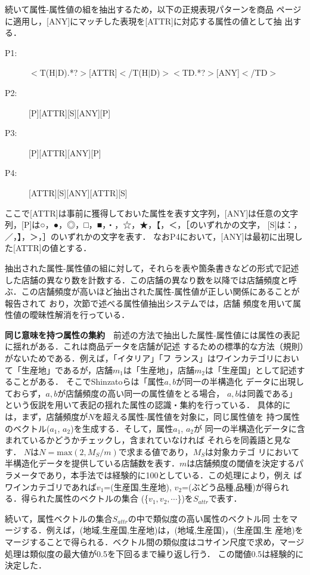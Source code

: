 \documentclass[japanese]{jnlp_1.4}
\begin{document}
続いて属性-属性値の組を抽出するため，以下の正規表現パターンを商品
ページに適用し，[ANY]にマッチした表現を[ATTR]に対応する属性の値として抽
出する．

\newpage
\begin{description}
\item [P1:] $<$T(H$|$D).*?$>$[ATTR]$<$/T(H$|$D)$><$TD.*?$>$[ANY]$<$/TD$>$
\item [P2:] [P][ATTR][S][ANY][P]
\item [P3:] [P][ATTR][ANY][P]
\item [P4:] [ATTR][S][ANY][ATTR][S]
\end{description}

\noindent
ここで[ATTR]は事前に獲得しておいた属性を表す文字列，[ANY]は任意の文字列，[P]は○，●，◎，□，■，・，☆，★，【，＜，［のいずれかの文字，
[S]は：，／，】，＞，］のいずれかの文字を表す．
なおP4において，[ANY]は最初に出現した[ATTR]の値とする．

抽出された属性-属性値の組に対して，それらを表や箇条書きなどの形式で記述
した店舗の異なり数を計数する．この店舗の異なり数を以降では店舗頻度と呼
ぶ．この店舗頻度が高いほど抽出された属性-属性値が正しい関係にあることが報告されて
おり\cite{shinzato2013}，次節で述べる属性値抽出システムでは，店舗
頻度を用いて属性値の曖昧性解消を行っている．

\vspace{1\Cvs}
\noindent
\textbf{同じ意味を持つ属性の集約}　前述の方法で抽出した属性-属性値には属性の表記に揺れがある．これは商品データを店舗が記述
するための標準的な方法（規則）がないためである．例えば，「イタリア」「フ
ランス」はワインカテゴリにおいて「生産地」であるが，店舗$m_1$は「生産地」，店舗$m_2$は「生産国」として記述することがある．
そこでShinzatoらは「属性$a, b$が同一の半構造化
データに出現しておらず，$a, b$が店舗頻度の高い同一の属性値をとる場合，
$a, b$は同義である」という仮説を用いて表記の揺れた属性の認識・集約を行っている．
具体的には，まず，店舗頻度が$N$を超える属性-属性値を対象に，同じ属性値を
持つ属性のベクトル($a_1$, $a_2$)を生成する．そして，属性$a_1$, $a_2$が
同一の半構造化データに含まれているかどうかチェックし，含まれていなければ
それらを同義語と見なす．
$N$は$N = \mathrm{max}(2, M_S/m)$で求まる値であり，$M_S$は対象カテゴ
リにおいて半構造化データを提供している店舗数を表す．$m$は店舗頻度の閾値を決定するパラメータであり，本手法では経験的に100としている．この処理により，例え
ばワインカテゴリであれば$v_1$=(生産国,生産地), $v_2$=(ぶどう品種,品種)が得られる．得られた属性のベクトルの集合
(\{$v_1, v_2, \cdots$\})を$S_{attr}$で表す．

続いて，属性ベクトルの集合$S_{attr}$の中で類似度の高い属性のベクトル同
士をマージする．例えば，(地域,生産国,生産地)は，(地域,生産国)，(生産国,生
産地)をマージすることで得られる．ベクトル間の類似度はコサイン尺度で求め，マージ処理は類似度の最大値が0.5を下回るまで繰り返し行う．
この閾値0.5は経験的に決定した．
\end{document}
